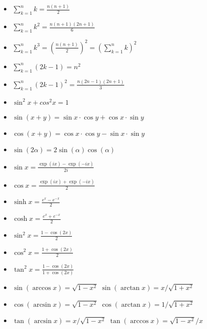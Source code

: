   \begin{example} $ $
  	\begin{itemize}
        \item $\sum_{k=1}^{n}k = \frac{n(n+1)}{2}$
		\item $\sum_{k=1}^{n}k^2 = \frac{n(n+1)(2n+1)}{6}$
		\item $\sum_{k=1}^{n}k^3 = (\frac{n(n+1)}{2})^2= (\sum_{k=1}^{n}k)^2$
		\item $\sum_{k=1}^{n}(2k-1) = n^2$
		\item $\sum_{k=1}^{n}(2k-1)^2 = \frac{n(2n-1)(2n+1)}{3}$
        \item $ \sin^2 x + cos^2x = 1 $
		\item $ \sin (x+y) = \sin x \cdot \cos y + \cos x \cdot \sin y $
		\item $ \cos (x+y) = \cos x \cdot \cos y - \sin x \cdot \sin y $
		\item $ \sin(2\alpha) = 2 \sin(\alpha)\cos(\alpha)$
        \item $ \sin x = \frac{\exp{(ix)} - \exp {(-ix)}}{2i} $
        \item $ \cos x = \frac{\exp{(ix)} + \exp{(-ix)}}{2} $
        \item $ \sinh{x} = \frac{e^x - e^{-x}}{2} $
        \item $ \cosh{x} = \frac{e^x + e^{-x}}{2} $
        \item $ \sin^2{x} = \frac{1 - \cos{(2x)}}{2} $
        \item $ \cos^2{x} = \frac{1 + \cos{(2x)}}{2} $
        \item $ \tan^2{x} = \frac{1 - \cos{(2x)}}{1 + \cos{(2x)}} $
        \item $ \sin(\arccos x) = \sqrt{1-x^2} $ \tab $ \sin(\arctan x) = x/\sqrt{1+x^2} $
        \item $ \cos(\arcsin x) = \sqrt{1-x^2} $ \tab $ \cos(\arctan x) = 1 / \sqrt{1+x^2} $
        \item $ \tan(\arcsin x) = x/\sqrt{1-x^2} $ \tab $ \tan(\arccos x) = \sqrt{1-x^2}/x $
  	\end{itemize}
  \end{example}
  
